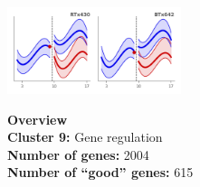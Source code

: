 \begin{multicols}{2}
\includegraphics[width=2in]{figures/clusters/root_Postflowering_8.png}
\columnbreak

\noindent \textbf{Overview}\\\textbf{Cluster 9:} Gene regulation \\
\textbf{Number of genes:} 2004 \\
\textbf{Number of ``good'' genes:} 615 \\
\end{multicols}

